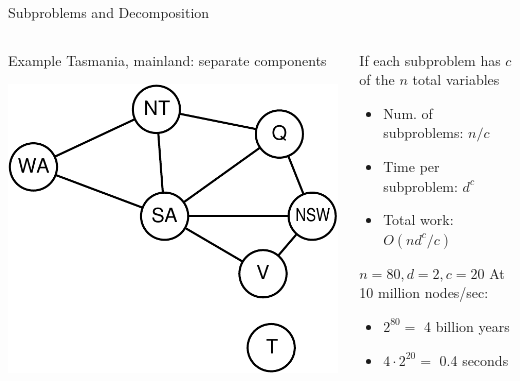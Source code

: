 \documentclass[14pt]{beamer}
\begin{document}
\begin{frame}[label=decomposition]{Subproblems and Decomposition}
\begin{columns}[T]
\begin{column}{0.4\textwidth}
\begin{block}{Example}
Tasmania, mainland: separate components
\end{block}
\includegraphics[width=\textwidth]{australia-csp.pdf}
\end{column}
\pause
\begin{column}{0.55\textwidth}
\begin{block}{If each subproblem has $c$ of the $n$ total variables}
\begin{itemize}
\item Num. of subproblems: \pause$n/c$
\pause\item Time per subproblem: \pause$d^c$
\pause\item Total work: \pause$O(nd^c/c)$
\end{itemize}
\end{block}
\pause
\begin{block}{$n=80, d=2, c=20$}
At 10 million nodes/sec:
\begin{itemize}
\item $2^{80} =$ 4 billion years 
\item $4 \cdot 2^{20} =$ 0.4 seconds
\end{itemize}
\end{block}
\end{column}
\end{columns}
\end{frame}
\end{document}
